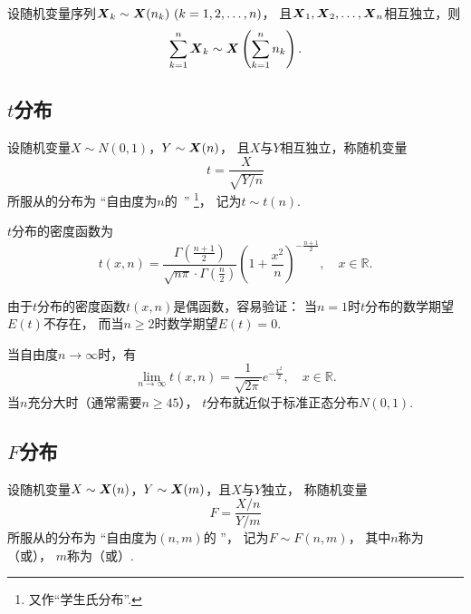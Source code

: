 \begin{corollary}\label{theorem:数理统计的基础知识.卡方分布的可加性2}
设随机变量序列\(\x_k \sim \x(n_k)\ (k=1,2,\dotsc,n)\)，
且\(\boldsymbol{X}_1,\boldsymbol{X}_2,\dotsc,\boldsymbol{X}_n\)相互独立，则\begin{equation}
	\sum_{k=1}^n \boldsymbol{X}_k \sim \boldsymbol{X}\left(\sum_{k=1}^n{n_k}\right).
\end{equation}
\end{corollary}

\subsection{\texorpdfstring{\(t\)}{t}分布}
\begin{definition}
设随机变量\(X \sim N(0,1)\)，\(Y \sim \boldsymbol{X}(n)\)，
且\(X\)与\(Y\)相互独立，称随机变量\begin{equation}
	t = \frac{X}{\sqrt{Y/n}}
\end{equation}
所服从的分布为
“自由度为\(n\)的~”
\footnote{又作“学生氏分布”.}，
记为\(t \sim t(n)\).
\end{definition}

\begin{theorem}\label{theorem:数理统计的基础知识.学生氏分布的密度函数}
\(t\)分布的密度函数为\begin{equation}
	t(x,n) = \frac{
		\Gamma\left(\frac{n+1}{2}\right)
	}{
		\sqrt{n\pi} \cdot \Gamma\left(\frac{n}{2}\right)
	}
	\left(1+\frac{x^2}{n}\right)^{-\frac{n+1}{2}},
	\quad x \in \mathbb{R}.
\end{equation}
\end{theorem}

由于\(t\)分布的密度函数\(t(x,n)\)是偶函数，容易验证：
当\(n=1\)时\(t\)分布的数学期望\(E(t)\)不存在，
而当\(n \geq 2\)时数学期望\(E(t)=0\).

当自由度\(n\to\infty\)时，有\[
	\lim_{n\to\infty} t(x,n) = \frac{1}{\sqrt{2\pi}} e^{-\frac{x^2}{2}},
	\quad x \in \mathbb{R}.
\]
当\(n\)充分大时（通常需要\(n \geq 45\)），
\(t\)分布就近似于标准正态分布\(N(0,1)\).

\subsection{\texorpdfstring{\(F\)}{F}分布}
\begin{definition}
设随机变量\(X \sim \boldsymbol{X}(n)\)，\(Y \sim \boldsymbol{X}(m)\)，且\(X\)与\(Y\)独立，
称随机变量\begin{equation}
	F=\frac{X/n}{Y/m}
\end{equation}
所服从的分布为
“自由度为\((n,m)\)的 ”，
记为\(F \sim F(n,m)\)，
其中\(n\)称为（或），
\(m\)称为（或）.
\end{definition}

